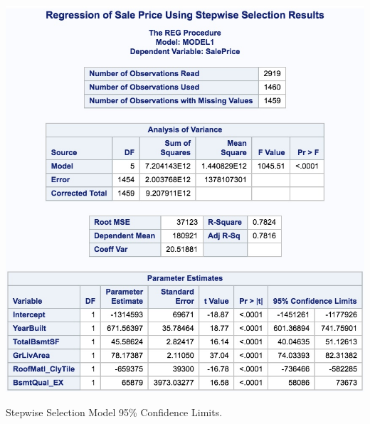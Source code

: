 \documentclass[11pt]{scrartcl} %
\begin{document}
\hrulefill
\begin{table}[H] %
	\centering %
	\includegraphics[scale=.3]{../graphics/A2SWCI}
	\caption{Stepwise Selection Model 95\% Confidence Limits.}
	\label{tab:A2SWCI}
\end{table}
\hrulefill
\pagebreak
\end{document}

